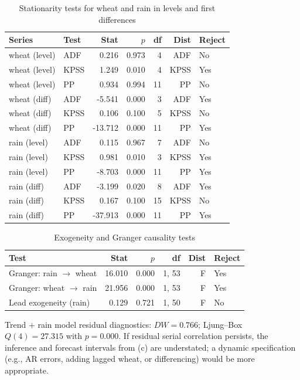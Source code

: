 \documentclass{article}
\begin{document}
\begin{table}[H]
\centering
\begin{tabular}{llrrrrl}
\hline
Series & Test & Stat & $p$ & df & Dist & Reject \\
\hline
wheat (level) & ADF & 0.216 & 0.973 & 4 & ADF & No \\
wheat (level) & KPSS & 1.249 & 0.010 & 4 & KPSS & Yes \\
wheat (level) & PP & 0.934 & 0.994 & 11 & PP & No \\
wheat (diff) & ADF & -5.541 & 0.000 & 3 & ADF & Yes \\
wheat (diff) & KPSS & 0.106 & 0.100 & 5 & KPSS & No \\
wheat (diff) & PP & -13.712 & 0.000 & 11 & PP & Yes \\
rain (level) & ADF & 0.115 & 0.967 & 7 & ADF & No \\
rain (level) & KPSS & 0.981 & 0.010 & 3 & KPSS & Yes \\
rain (level) & PP & -8.703 & 0.000 & 11 & PP & Yes \\
rain (diff) & ADF & -3.199 & 0.020 & 8 & ADF & Yes \\
rain (diff) & KPSS & 0.167 & 0.100 & 15 & KPSS & No \\
rain (diff) & PP & -37.913 & 0.000 & 11 & PP & Yes \\
\hline
\end{tabular}
\caption{Stationarity tests for wheat and rain in levels and first differences}
\end{table}

\begin{table}[H]
\centering
\begin{tabular}{lrrrrl}
\hline
Test & Stat & $p$ & df & Dist & Reject \\
\hline
Granger: rain $\rightarrow$ wheat & 16.010 & 0.000 & 1, 53 & F & Yes \\
Granger: wheat $\rightarrow$ rain & 21.956 & 0.000 & 1, 53 & F & Yes \\
Lead exogeneity (rain) & 0.129 & 0.721 & 1, 50 & F & No \\
\hline
\end{tabular}
\caption{Exogeneity and Granger causality tests}
\end{table}

Trend + rain model residual diagnostics: $DW=0.766$; Ljung--Box $Q(4)=27.315$ with $p=0.000$. 
If residual serial correlation persists, the inference and forecast intervals from (c) are understated; 
a dynamic specification (e.g., AR errors, adding lagged wheat, or differencing) would be more appropriate.
\end{document}
